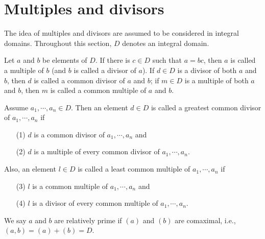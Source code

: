 \section{Multiples and divisors}

The idea of multiples and divisors are assumed to be considered in integral domains.
Throughout this section, $D$ denotes an integral domain.

\begin{defi}
    Let $a$ and $b$ be elements of $D$.
    If there is $c\in D$ such that $a=bc$, then $a$ is called a multiple of $b$ (and $b$ is called a divisor of $a$).
    If $d\in D$ is a divisor of both $a$ and $b$, then $d$ is called a common divisor of $a$ and $b$; if $m\in D$ is a multiple of both $a$ and $b$, then $m$ is called a common multiple of $a$ and $b$.

    Assume $a_1, \cdots, a_n\in D$.
    Then an element $d\in D$ is called a greatest common divisor of $a_1, \cdots, a_n$ if
    \begin{enumerate}
        \item[(1)]
        {
            $d$ is a common divisor of $a_1, \cdots, a_n$ and
        }
        \item[(2)]
        {
            $d$ is a multiple of every common divisor of $a_1, \cdots, a_n$.
        }
    \end{enumerate}
    Also, an element $l\in D$ is called a least common multiple of $a_1, \cdots, a_n$ if
    \begin{enumerate}
        \item[(3)]
        {
            $l$ is a common multiple of $a_1, \cdots, a_n$ and
        }
        \item[(4)]
        {
            $l$ is a divisor of every common multiple of $a_1, \cdots, a_n$.
        }
    \end{enumerate}

    We say $a$ and $b$ are relatively prime if $(a)$ and $(b)$ are comaximal, i.e., $(a, b)=(a)+(b)=D$.
\end{defi}

